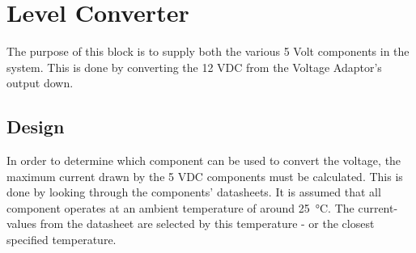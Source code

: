 \newpage
\section{Level Converter}
The purpose of this block is to supply both the various 5 Volt components in the system. This is done by converting the 12 VDC from the Voltage Adaptor's output down.

\subsection{Design}
In order to determine which component can be used to convert the voltage, the maximum current drawn by the 5 VDC components must be calculated. This is done by looking through the components' datasheets. It is assumed that all component operates at an ambient temperature of around \SI{25}{\celsius}. The current-values from the datasheet are selected by this temperature - or the closest specified temperature.
